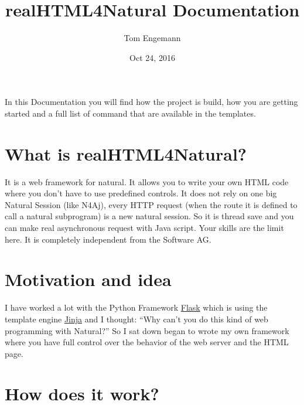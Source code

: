 \documentclass[letterpaper,10pt,english]{sphinxmanual}
\title{realHTML4Natural Documentation}
\date{Oct 24, 2016}
\author{Tom Engemann}
\begin{document}
\maketitle
\tableofcontents
{}\label{index::doc}


In this Documentation you will find how the project is build, how you are getting started and a full list of command that are available in the templates.


\chapter{What is realHTML4Natural?}
\label{index:realhtml4natural-documentation}\label{index:what-is-realhtml4natural}
It is a web framework for natural. It allows you to write your own HTML code where you don't have to use predefined controls. It does not rely on one big Natural Session (like N4Aj), every HTTP request (when the route it is defined to call a natural subprogram) is a new natural session. So it is thread save and you can make real asynchronous request with Java script.
Your skills are the limit here. It is completely independent from the Software AG.


\chapter{Motivation and idea}
\label{index:motivation-and-idea}
I have worked a lot with the Python Framework \href{http://flask.pocoo.org/}{Flask} which is using the template engine \href{http://jinja.pocoo.org/}{Jinja} and I thought: ``Why can't you do this kind of web programming with Natural?'' So I sat down began to wrote my own framework where you have full control over the behavior of the web server and the HTML page.


\chapter{How does it work?}
\label{index:how-does-it-work}
\noindent{}
\end{document}
